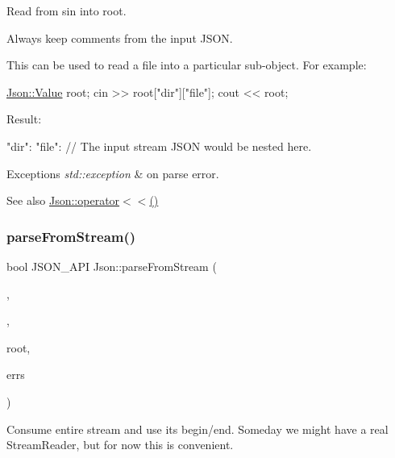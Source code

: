 Read from \textquotesingle{}sin\textquotesingle{} into \textquotesingle{}root\textquotesingle{}. 

Always keep comments from the input J\+S\+ON.

This can be used to read a file into a particular sub-\/object. For example\+: 
\begin{DoxyCode}
\hyperlink{classJson_1_1Value}{Json::Value} root;
cin >> root[\textcolor{stringliteral}{"dir"}][\textcolor{stringliteral}{"file"}];
cout << root;
\end{DoxyCode}
 Result\+: \begin{DoxyVerb}{
"dir": {
    "file": {
    // The input stream JSON would be nested here.
    }
}
}
\end{DoxyVerb}
 
\begin{DoxyExceptions}{Exceptions}
{\em std\+::exception} & on parse error. \\
\hline
\end{DoxyExceptions}
\begin{DoxySeeAlso}{See also}
\hyperlink{namespaceJson_a975d1dbca8aa7a06f38d373edcb9081c}{Json\+::operator$<$$<$()} 
\end{DoxySeeAlso}
\mbox{\label{namespaceJson_aab0cf1ecf81d1aeca12be2a416a84352}} 
\subsubsection{\texorpdfstring{parse\+From\+Stream()}{parseFromStream()}}
{\footnotesize\ttfamily bool J\+S\+O\+N\+\_\+\+A\+PI Json\+::parse\+From\+Stream (\begin{DoxyParamCaption}\item[{\hyperlink{classJson_1_1CharReader_1_1Factory}{Char\+Reader\+::\+Factory} const \&}]{,  }\item[{J\+S\+O\+N\+C\+P\+P\+\_\+\+I\+S\+T\+R\+E\+AM \&}]{,  }\item[{\hyperlink{classJson_1_1Value}{Value} $\ast$}]{root,  }\item[{std\+::string $\ast$}]{errs }\end{DoxyParamCaption})}

Consume entire stream and use its begin/end. Someday we might have a real Stream\+Reader, but for now this is convenient. \mbox{\label{namespaceJson_a48f4e3ea655e3b4a5d7f892c81f00511}} 
